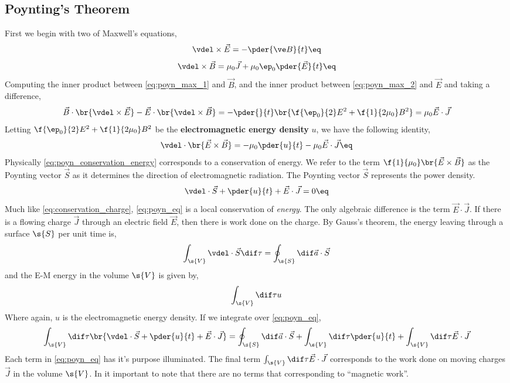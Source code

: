 \documentclass{article}
\begin{document}
\subsection{Poynting's Theorem}
First we begin with two of Maxwell's equations,
\[ \vdel \times \vec{E} = - \pder{\ve B}{t} \eq \label{eq:poyn_max_1}\]
\[ \vdel \times \vec{B} = \mu_0 \vec{J} + \mu_0 \ep_0 \pder{\vec{E}}{t} \eq \label{eq:poyn_max_2}\]
Computing the inner product between \cref{eq:poyn_max_1} and $\vec{B}$, and the inner product between \cref{eq:poyn_max_2} and $\vec{E}$ and taking a difference,
\[ \vec{B} \cdot \br{\vdel \times \vec{E}} - \vec{E} \cdot \br{\vdel \times \vec{B}} = - \pder{}{t}\br{\f{\ep_0}{2} E^2 + \f{1}{2 \mu_0} B^2} = \mu_0 \vec{E} \cdot \vec{J}\]
Letting $\f{\ep_0}{2} E^2 + \f{1}{2 \mu_0} B^2$ be the \textbf{electromagnetic energy density} $u$, we have the following identity,
\[ \vdel\cdot\br{\vec{E} \times \vec{B}} = - \mu_0 \pder{u}{t} - \mu_0 \vec{E} \cdot \vec{J} \eq \label{eq:poyn_conservation_energy} \]
Physically \cref{eq:poyn_conservation_energy} corresponds to a conservation of energy. We refer to the term $\f{1}{\mu_0} \br{\vec{E} \times \vec{B}}$ as the Poynting vector $\vec{S}$ as it determines the direction of electromagnetic radiation. The Poynting vector $\vec{S}$ represents the power density.
\[ \vdel \cdot \vec{S} + \pder{u}{t} + \vec{E} \cdot \vec{J} = 0 \eq \label{eq:poyn_eq}\]
Much like \cref{eq:conservation_charge}, \cref{eq:poyn_eq} is a local conservation of \textit{energy}. The only algebraic difference is the term $\vec{E} \cdot \vec{J}$. If there is a flowing charge $\vec{J}$ through an electric field $\vec{E}$, then there is work done on the charge. By Gauss's theorem, the energy leaving through a surface $\s{S}$ per unit time is,
\[ \int_{\s{V}} \vdel \cdot \vec{S} \dif \tau =  \oint_{\s{S}} \dif \vec{a}\cdot \vec{S} \]
and the E-M energy in the volume $\s{V}$ is given by,
\[ \int_{\s{V}} \dif \tau u \]
Where again, $u$ is the electromagnetic energy density. If we integrate over \cref{eq:poyn_eq},
\[\int_{\s{V}} \dif \tau \br{\vdel \cdot \vec{S} +\pder{u}{t} + \vec{E} \cdot \vec{J}} = \oint_{\s{S}} \dif \vec{a}\cdot \vec{S} + \int_{\s{V}} \dif \tau \pder{u}{t} + \int_{\s{V}} \dif \tau \vec{E} \cdot \vec{J} \]
Each term in \cref{eq:poyn_eq} has it's purpose illuminated. The final term $\int_{\s{V}} \dif \tau \vec{E} \cdot \vec{J}$ corresponds to the work done on moving charges $\vec{J}$ in the volume $\s{V}$. In it important to note that there are no terms that corresponding to ``magnetic work''. \\
\end{document}
